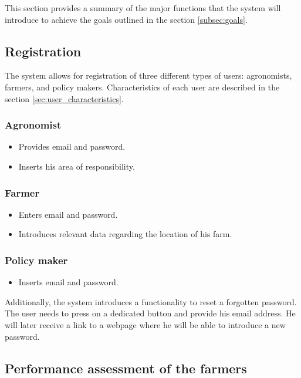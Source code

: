 This section provides a summary of the major functions that the system will introduce to achieve the goals outlined in the section \ref{subsec:goals}.

\subsection{Registration}
The system allows for registration of three different types of users: agronomists, farmers, and policy makers. Characteristics of each user are described in the section \ref{sec:user_characteristics}.

\subsubsection*{Agronomist}

\begin{itemize}
    \item Provides email and password.
    \item Inserts his area of responsibility.
\end{itemize}

\subsubsection*{Farmer}

\begin{itemize}
    \item Enters email and password.
    \item Introduces relevant data regarding the location of his farm.
\end{itemize}

\subsubsection*{Policy maker}

\begin{itemize}
    \item Inserts email and password.
\end{itemize}

Additionally, the system introduces a functionality to reset a forgotten password. The user needs to press on a dedicated button and provide his email address. He will later receive a link to a webpage where he will be able to introduce a new password. 

\subsection{Performance assessment of the farmers}

